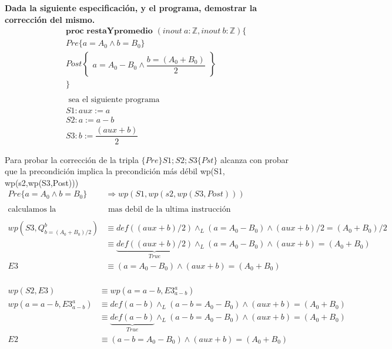 \begin{shaded}
\textbf{Dada la siguiente especificaci\'on, y el programa, demostrar la correcci\'on del mismo.  } \\
\begin{align*}
& \textbf{proc restaYpromedio } (inout \ a: \mathbb{Z}, inout \ b: \mathbb{Z}) \{  \\
& Pre \{ a=A_0 \wedge b = B_0 \}   \\
& Post  \begin{Bmatrix} a = A_0 - B_0 \wedge \dfrac{b = (A_0 + B_0 )}{2} \end{Bmatrix} \\
& \} \\ \\
& \text{ sea el siguiente programa } \\
& S1: aux := a \\
& S2:a := a-b \\
& S3: b := \dfrac{(aux + b)}{2}
\end{align*}
\end{shaded}
Para probar la corrección de la tripla  $ \{ Pre \} S1;S2;S3\{Pst \}$ 
alcanza con probar  que la precondición implica la precondición más débil wp(S1, wp(s2,wp(S3,Post))) \\

\begin{align*}
Pre \{ a=A_0 \wedge b = B_0 \}  &\Rightarrow wp(S1, wp(s2,wp(S3,Post))) \\ \\
\text{calculamos la precondicion } & \text{ mas debil de la ultima instrucci\'on} \\ \\
wp \left(S3, Q_{ b = (A_0 + B_0 )/2}^{b} \right)  &\equiv def ((aux + b )/2)  \wedge_L (a = A_0 - B_0) \wedge (aux + b )/2 = (A_0 + B_0 )/2 \\
&\equiv \underbrace{ def ((aux + b )/2)}_{True}  \wedge_L (a = A_0 - B_0) \wedge (aux + b ) = (A_0 + B_0 ) \\
E3 &\equiv (a = A_0 - B_0) \wedge (aux + b ) = (A_0 + B_0 ) \\
\end{align*}

\begin{align*}
wp (S2, E3)  &\equiv wp ( a= a-b, E3_{a-b}^{a})   \\
wp ( a= a-b, E3_{a-b}^{a})  &\equiv def (a- b )  \wedge_L (a-b = A_0 - B_0) \wedge (aux + b ) = (A_0 + B_0 ) \\
&\equiv \underbrace{ def (a- b )}_{True}  \wedge_L (a-b = A_0 - B_0) \wedge (aux + b ) = (A_0 + B_0 ) \\
E2 &\equiv (a-b = A_0 - B_0) \wedge (aux + b ) = (A_0 + B_0 )\\
\end{align*}

